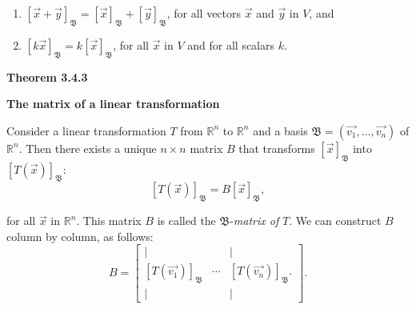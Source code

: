 \renewcommand{\labelenumi}{\textbf{\alph{enumi}.}}
\begin{enumerate}
\item $\displaystyle [\vec{x}+\vec{y}]_{\mathfrak{B}}=[\vec{x}]_{\mathfrak{B}}+[\vec{y}]_{\mathfrak{B}}$, for all vectors $\vec{x}$ and $\vec{y}$ in $V$, and
\item $\displaystyle [k\vec{x}]_{\mathfrak{B}}=k[\vec{x}]_{\mathfrak{B}}$, for all $\vec{x}$ in $V$ and for all scalars $k$.
\end{enumerate}
\textbf{Theorem 3.4.3}\\
\par\noindent\textbf{The matrix of a linear transformation}
\par\noindent Consider a linear transformation $T$ from $\mathbb{R}^{n}$ to $\mathbb{R}^{n}$ and a basis $\mathfrak{B}=(\vec{v_{1}},\ldots{},\vec{v_{n}})$ of $\mathbb{R}^{n}$. Then there exists a unique $n\times{}n$ matrix $B$ that transforms $[\vec{x}]_{\mathfrak{B}}$ into $[T(\vec{x})]_{\mathfrak{B}}$:
\[[T(\vec{x})]_{\mathfrak{B}}=B[\vec{x}]_{\mathfrak{B}},\]
\par\noindent for all $\vec{x}$ in $\mathbb{R}^{n}$. This matrix $B$ is called the $\mathfrak{B}$-\textit{matrix of }$T$. We can construct $B$ column by column, as follows:
\[B=\left[\begin{array}{ccc}|& &|\\{} [T(\vec{v_{1}})]_{\mathfrak{B}}&\cdots{}&[T(\vec{v_{n}})]_{\mathfrak{B}}.\\ |& &|\end{array}\right].\]
